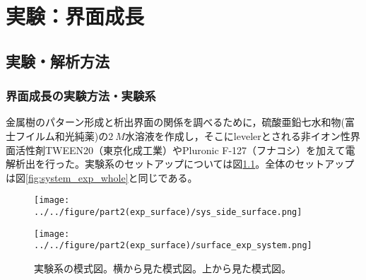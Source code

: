 \documentclass[autodetect-engine,dvi=dvipdfmx,a4paper,ja=standard,oneside,openany,11pt]{bxjsbook}
\begin{document}
\chapter{実験：界面成長}
\section{実験・解析方法}
\subsection{界面成長の実験方法・実験系}
金属樹のパターン形成と析出界面の関係を調べるために，硫酸亜鉛七水和物(富士フイルム和光純薬)の$\SI{2}{M}$水溶液を作成し，そこにlevelerとされる非イオン性界面活性剤TWEEN20（東京化成工業）やPluronic F-127（フナコシ）を加えて電解析出を行った。実験系のセットアップについては図\ref{fig:surface_exp_system}。全体のセットアップは図\ref{fig:system_exp_whole}と同じである。

\begin{figure}[htbp]
  \begin{minipage}
    {0.55\textwidth}
    \subcaption{}
    \centering
    \texttt{[image: ../../figure/part2(exp\_surface)/sys\_side\_surface.png]}
    \label{fig:sys_side_surface}
  \end{minipage}
  \begin{minipage}{0.4\hsize}
    \subcaption{}
    \centering
    \texttt{[image: ../../figure/part2(exp\_surface)/surface\_exp\_system.png]}
    \label{fig:sys_top_surface}
  \end{minipage}
  \caption{実験系の模式図。横から見た模式図。上から見た模式図。}
  \label{fig:surface_exp_system}
\end{figure}
\end{document}

